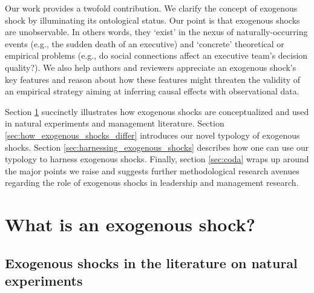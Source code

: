 \documentclass[11pt]{article}
\begin{document}
\begin{refsection}
Our work provides a twofold contribution. We  clarify the concept of exogenous
shock by illuminating its ontological status.  Our point is that exogenous
shocks are unobservable. In others words, they `exist' in the nexus of 
naturally-occurring events (e.g., the sudden death of an executive) and 
`concrete' theoretical or empirical problems
(e.g., do social connections affect an executive team's decision quality?).
We also help authors and reviewers appreciate an exogenous shock's key 
features and reason about how these features might threaten the validity of 
an empirical strategy aiming at inferring causal effects with observational 
data.

Section \ref{sec:what_exogenous_shocks} succinctly illustrates how exogenous 
shocks are conceptualized and used in natural experiments and management
literature.  Section \ref{sec:how_exogenous_shocks_differ} introduces our novel
typology of exogenous shocks.  Section \ref{sec:harnessing_exogenous_shocks}
describes how one can use our typology to harness exogenous shocks. Finally,
section \ref{sec:coda} wraps up around the major points we raise and suggests
further methodological research avenues regarding the role of exogenous shocks
in leadership and management research.

\section{What is an exogenous shock?}
\label{sec:what_exogenous_shocks}

\subsection{Exogenous shocks in the literature on natural experiments}
\label{subsec:exogenous_shocks_and_ne}


\end{refsection}
\end{document}
